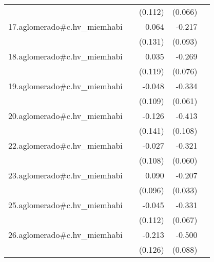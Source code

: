 {\begin{longtable}{l*{4}{D{.}{.}{-1}}}
            &                     &     (0.112)         &     (0.066)         &                     \\
\addlinespace
17.aglomerado#c.hv\_miemhabi&                     &       0.064         &      -0.217\sym{*}  &                     \\
            &                     &     (0.131)         &     (0.093)         &                     \\
\addlinespace
18.aglomerado#c.hv\_miemhabi&                     &       0.035         &      -0.269\sym{***}&                     \\
            &                     &     (0.119)         &     (0.076)         &                     \\
\addlinespace
19.aglomerado#c.hv\_miemhabi&                     &      -0.048         &      -0.334\sym{***}&                     \\
            &                     &     (0.109)         &     (0.061)         &                     \\
\addlinespace
20.aglomerado#c.hv\_miemhabi&                     &      -0.126         &      -0.413\sym{***}&                     \\
            &                     &     (0.141)         &     (0.108)         &                     \\
\addlinespace
22.aglomerado#c.hv\_miemhabi&                     &      -0.027         &      -0.321\sym{***}&                     \\
            &                     &     (0.108)         &     (0.060)         &                     \\
\addlinespace
23.aglomerado#c.hv\_miemhabi&                     &       0.090         &      -0.207\sym{***}&                     \\
            &                     &     (0.096)         &     (0.033)         &                     \\
\addlinespace
25.aglomerado#c.hv\_miemhabi&                     &      -0.045         &      -0.331\sym{***}&                     \\
            &                     &     (0.112)         &     (0.067)         &                     \\
\addlinespace
26.aglomerado#c.hv\_miemhabi&                     &      -0.213         &      -0.500\sym{***}&                     \\
            &                     &     (0.126)         &     (0.088)         &                     \\

\end{longtable}}
